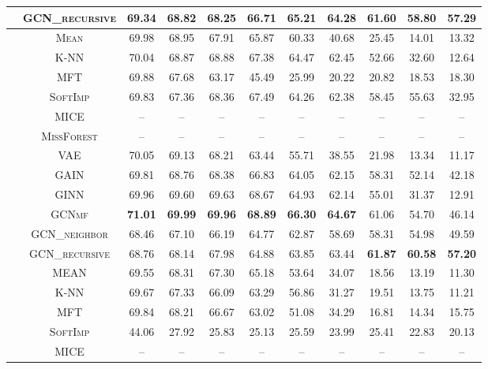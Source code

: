 \begin{table}[!pt]
{\begin{tabular}{c|c|ccccccccc}
& \textsc{GCN\_recursive} & 69.34 & 68.82 & 68.25 & 66.71 & 65.21 & 64.28 & \bf{61.60} & \bf{58.80} & \bf{57.29} \\ 
\midrule
{} & \textsc{Mean} & 69.98 & 68.95 & 67.91 & 65.87 & 60.33 & 40.68 & 25.45 & 14.01 & 13.32\\
& \textsc{K-NN} & 70.04 & 68.87 & 68.88 & 67.38 & 64.47 & {62.45} & 52.66 & 32.60 & 12.64\\
& \textsc{MFT} & 69.88 & 67.68 & 63.17 & 45.49 & 25.99 & 20.22 & 20.82 & 18.53 & 18.30\\
& \textsc{SoftImp} & 69.83 & 67.36 & 68.36 & 67.49 & 64.26 & 62.38 & {58.45} & 55.63 & 32.95\\
& \textsc{MICE} & -- & -- & -- & -- & -- & -- & -- & -- & --\\
& \textsc{MissForest} & -- & -- & -- & -- & -- & -- & -- & -- & --\\
& \textsc{VAE} & {70.05} & 69.13 & 68.21 & 63.44 & 55.71 & 38.55 & 21.98 & 13.34 & 11.17\\
& \textsc{GAIN} & 69.81 & 68.76 & 68.38 & 66.83 & 64.05 & 62.15 & 58.31 & 52.14 & {42.18}\\
& \textsc{GINN} & 69.96 & {69.60} & {69.63} & {68.67} & {64.93} & 62.14 & 55.01 & 31.37 & 12.91\\
& \textsc{GCNmf} & \textbf{71.01} & \textbf{69.99} & \textbf{69.96} & \textbf{68.89} & \textbf{66.30} & \textbf{64.67} & 61.06 & {54.70} & 46.14\\ 
&\textsc{GCN\_neighbor}  & 68.46 & 67.10 & 66.19 & 64.77 & 62.87 & 58.69 & 58.31 & 54.98 & 
49.59 \\
&\textsc{GCN\_recursive}  & 68.76 & 68.14 & 67.98 & 64.88 & 63.85 & 63.44 & \textbf{61.87} & \textbf{60.58} & \textbf{57.20} \\
\midrule
{} & \textsc{MEAN} & 69.55 & {68.31} & 67.30 & {65.18} & 53.64 & 34.07 & 18.56 & 13.19 & 11.30\\
& \textsc{K-NN} & 69.67 & 67.33 & 66.09 & 63.29 & 56.86 & 31.27 & 19.51 & 13.75 & 11.21\\
& \textsc{MFT} & {69.84} & 68.21 & {66.67} & 63.02 & 51.08 & 34.29 & 16.81 & 14.34 & 15.75\\
& \textsc{SoftImp} & 44.06 & 27.92 & 25.83 & 25.13 & 25.59 & 23.99 & 25.41 & 22.83 & {20.13}\\
& \textsc{MICE} & -- & -- & -- & -- & -- & -- & -- & -- & --\\

\end{tabular}}
\end{table}
